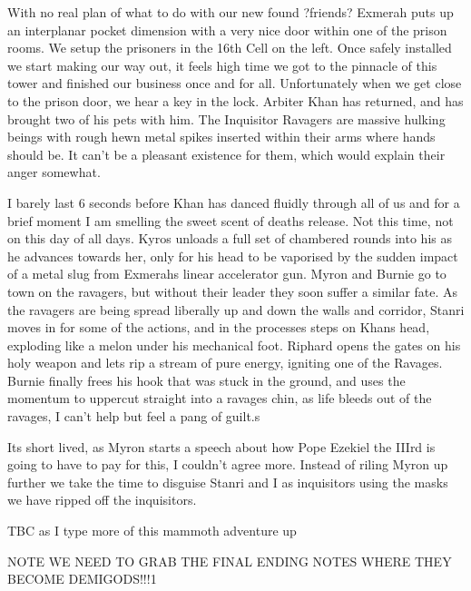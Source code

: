 With no real plan of what to do with our new found ?friends? Exmerah puts up an interplanar pocket dimension with a very nice door within one of the prison rooms. We setup the prisoners in the 16th Cell on the left. Once safely installed we start making our way out, it feels high time we got to the pinnacle of this tower and finished our business once and for all. Unfortunately when we get close to the prison door, we hear a key in the lock. Arbiter Khan has returned, and has brought two of his pets with him. The Inquisitor Ravagers are massive hulking beings with rough hewn metal spikes inserted within their arms where hands should be. It can’t be a pleasant existence for them, which would explain their anger somewhat.\medskip

I barely last 6 seconds before Khan has danced fluidly through all of us and for a brief moment I am smelling the sweet scent of deaths release. Not this time, not on this day of all days. Kyros unloads a full set of chambered rounds into his as he advances towards her, only for his head to be vaporised by the sudden impact of a metal slug from Exmerahs linear accelerator gun. Myron and Burnie go to town on the ravagers, but without their leader they soon suffer a similar fate. As the ravagers are being spread liberally up and down the walls and corridor, Stanri moves in for some of the actions, and in the processes steps on Khans head, exploding like a melon under his mechanical foot. Riphard opens the gates on his holy weapon and lets rip a stream of pure energy, igniting one of the Ravages. Burnie finally frees his hook that was stuck in the ground, and uses the momentum to uppercut straight into a ravages chin, as life bleeds out of the ravages, I can’t help but feel a pang of guilt.s\medskip

Its short lived, as Myron starts a speech about how Pope Ezekiel the IIIrd is going to have to pay for this, I couldn’t agree more. Instead of riling Myron up further we take the time to disguise Stanri and I as inquisitors using the masks we have ripped off the inquisitors.\medskip

TBC as I type more of this mammoth adventure up\medskip

NOTE WE NEED TO GRAB THE FINAL ENDING NOTES WHERE THEY BECOME DEMIGODS!!!1\medskip

\vspace*{5mm}

